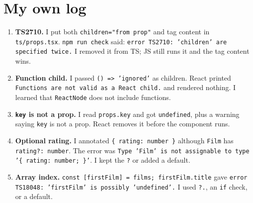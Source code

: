 \documentclass[
  11pt,
]{article}
\begin{document}
\section{My own log}\label{my-own-log}

\begin{enumerate}
\def\labelenumi{\arabic{enumi}.}
\item
  \textbf{TS2710.} I put both
  \texttt{children="from prop"} and tag content in
  \texttt{ts/props.tsx}.
  \texttt{npm run check} said:
  \texttt{error TS2710: 'children' are specified twice.}
  I removed it from TS; JS still runs it and the tag content wins.
\item
  \textbf{Function child.} I passed
  \texttt{() =\textgreater{} 'ignored'} as children. React printed
  \texttt{Functions are not valid as a React child.}
  and rendered nothing. I learned that
  \texttt{ReactNode} does not include functions.
\item
  \textbf{\texttt{key} is not a prop.} I read
  \texttt{props.key} and got
  \texttt{undefined}, plus a warning saying
  \texttt{key} is not a prop. React removes it before
  the component runs.
\item
  \textbf{Optional rating.} I annotated
  \texttt{\{ rating: number \}} although
  \texttt{Film} has
  \texttt{rating?: number}. The error was
  \texttt{Type 'Film' is not assignable to type '\{ rating: number; \}'}.
  I kept the \texttt{?} or added a default.
\item
  \textbf{Array index.}
  \texttt{const [firstFilm] = films; firstFilm.title}
  gave
  \texttt{error TS18048: 'firstFilm' is possibly 'undefined'.}
  I used \texttt{?.}, an \texttt{if}
  check, or a default.
\end{enumerate}
\end{document}
